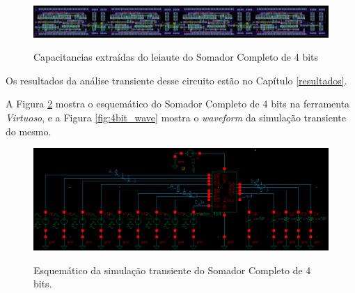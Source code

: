 \documentclass{iiufrgs}
\newcommand{\virtuoso}{\textit{Virtuoso}}
\begin{document}
\begin{figure}[htbp]
    \centering
    \caption{Capacitancias extraídas do leiaute do Somador Completo de 4 bits}
    \includegraphics[scale=0.175]{images/extracted_4bit.png}
    \label{fig:4bit_capacitancias}
\end{figure}

\FloatBarrier

Os resultados da análise transiente desse circuito estão no Capítulo \ref{resultados}.\

A Figura \ref{fig:4bit_trans} mostra o esquemático do Somador Completo de 4 bits na ferramenta \virtuoso, e a Figura \ref{fig:4bit_wave} mostra o \textit{waveform} da simulação transiente do mesmo.

\begin{figure}[htbp]
    \centering
    \caption{Esquemático da simulação transiente do Somador Completo de 4 bits.}
    \includegraphics[scale=0.35]{images/schem_4bit_trans.png}
    \label{fig:4bit_trans}
\end{figure}
\end{document}
